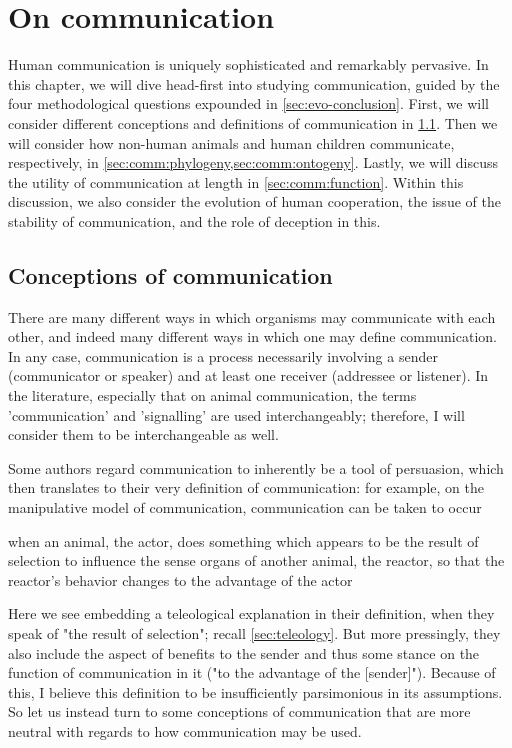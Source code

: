 \chapter{On communication}
\label{ch:communication}

Human communication is uniquely sophisticated and remarkably pervasive.
In this chapter, we will dive head-first into studying communication, guided by the four methodological questions expounded in \cref{sec:evo-conclusion}.
First, we will consider different conceptions and definitions of communication in \cref{sec:comm:definition}. Then we will consider how non-human animals and human children communicate, respectively, in \cref{sec:comm:phylogeny,sec:comm:ontogeny}. Lastly, we will discuss the utility of communication at length in \cref{sec:comm:function}. Within this discussion, we also consider the evolution of human cooperation, the issue of the stability of communication, and the role of deception in this.

\section{Conceptions of communication}
\label{sec:comm:definition}

There are many different ways in which organisms may communicate with each other, and indeed many different ways in which one may define communication. In any case, communication is a process necessarily involving a sender (communicator or speaker) and at least one receiver (addressee or listener). In the literature, especially that on animal communication, the terms 'communication' and 'signalling' are used interchangeably; therefore, I will consider them to be interchangeable as well.

Some authors regard communication to inherently be a tool of persuasion, which then translates to their very definition of communication: for example, on the manipulative model of communication, communication can be taken to occur
\begin{quoting}
    when an animal, the actor, does something which appears to be the result of selection to influence the sense organs of another animal, the reactor, so that the reactor's behavior changes to the advantage of the actor
    \hfill \citep[p.~283]{DawkinsKrebs78}
\end{quoting}
Here we see \citeauthor{DawkinsKrebs78} embedding a teleological explanation in their definition, when they speak of "the result of selection"; recall \cref{sec:teleology}.
But more pressingly, they also include the aspect of benefits to the sender and thus some stance on the function of communication in it ("to the advantage of the [sender]").
Because of this, I believe this definition to be insufficiently parsimonious in its assumptions. So let us instead turn to some conceptions of communication that are more neutral with regards to how communication may be used.

